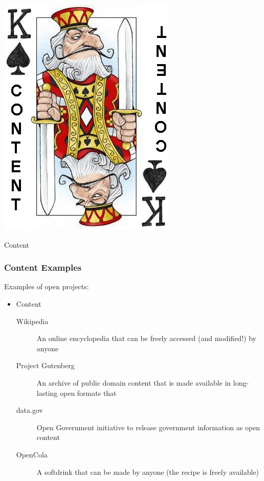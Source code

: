 \documentclass{beamer}
\begin{document}
\begin{frame}
  \begin{center} 
    \includegraphics[height=0.7\textheight]{../img/content-king}

    \begin{Huge} Content \end{Huge} 
  \end{center}
\end{frame}

\begin{frame}
  \frametitle{Content Examples}
  Examples of open projects:
  \begin{itemize}
  \item Content
    \begin{description}
    \item[Wikipedia] An online encyclopedia that can be freely accessed (and modified!) by anyone
    \item[Project Gutenberg] An archive of public domain content that is made available in long-lasting open formats that
    \item[data.gov] Open Government initiative to release government information as open content
    \item[OpenCola] A softdrink that can be made by anyone (the recipe
      is freely available)
    \end{description}
  \end{itemize}
\end{frame}
\end{document}
